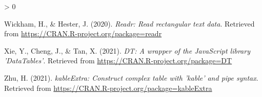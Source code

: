 \documentclass[
  english,
  man]{apa6}
\newlength{\cslhangindent}
\newenvironment{CSLReferences}[2] %
 {%
  \setlength{\parindent}{0pt}
  \ifodd #1 \everypar{\setlength{\hangindent}{\cslhangindent}}\ignorespaces\fi
  \ifnum #2 > 0
  \setlength{\parskip}{#2\baselineskip}
  \fi
 }%
 {}
\begin{document}
\begin{CSLReferences}{1}{0}
\leavevmode\hypertarget{ref-R-readr}{}%
Wickham, H., \& Hester, J. (2020). \emph{Readr: Read rectangular text data}. Retrieved from \url{https://CRAN.R-project.org/package=readr}

\leavevmode\hypertarget{ref-R-DT}{}%
Xie, Y., Cheng, J., \& Tan, X. (2021). \emph{DT: A wrapper of the JavaScript library 'DataTables'}. Retrieved from \url{https://CRAN.R-project.org/package=DT}

\leavevmode\hypertarget{ref-R-kableExtra}{}%
Zhu, H. (2021). \emph{kableExtra: Construct complex table with 'kable' and pipe syntax}. Retrieved from \url{https://CRAN.R-project.org/package=kableExtra}

\end{CSLReferences}

\endgroup
\end{document}
